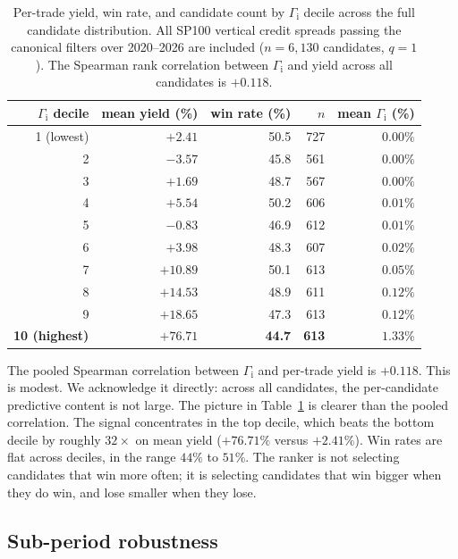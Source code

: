 \documentclass[11pt]{article}
\theoremstyle{definition}
\theoremstyle{remark}
\newcommand{\GROUND}{\Gamma_{\mathrm{i}}}
\begin{document}
\begin{table}[htbp]
\centering
\small
\begin{tabular}{rrrrr}
\toprule
$\GROUND$ decile & mean yield (\%) & win rate (\%) & $n$ & mean $\GROUND$ (\%) \\
\midrule
1 (lowest)  & $+2.41$  & 50.5 & 727 & $0.00\%$ \\
2           & $-3.57$  & 45.8 & 561 & $0.00\%$ \\
3           & $+1.69$  & 48.7 & 567 & $0.00\%$ \\
4           & $+5.54$  & 50.2 & 606 & $0.01\%$ \\
5           & $-0.83$  & 46.9 & 612 & $0.01\%$ \\
6           & $+3.98$  & 48.3 & 607 & $0.02\%$ \\
7           & $+10.89$ & 50.1 & 613 & $0.05\%$ \\
8           & $+14.53$ & 48.9 & 611 & $0.12\%$ \\
9           & $+18.65$ & 47.3 & 613 & $0.12\%$ \\
\textbf{10 (highest)}& $\mathbf{+76.71}$ & \textbf{44.7} & \textbf{613} & $\mathbf{1.33\%}$ \\
\bottomrule
\end{tabular}
\caption{Per-trade yield, win rate, and candidate count by
$\GROUND$ decile across the full candidate distribution. All SP100
vertical credit spreads passing the canonical filters over
2020--2026 are included ($n = 6{,}130$ candidates, $q = 1$). The
Spearman rank correlation between $\GROUND$ and yield across all
candidates is $+0.118$.}
\label{tab:decile}
\end{table}

The pooled Spearman correlation between $\GROUND$ and per-trade
yield is $+0.118$. This is modest. We acknowledge it directly:
across all candidates, the per-candidate predictive content is
not large. The picture in Table~\ref{tab:decile} is clearer than
the pooled correlation. The signal concentrates in the top
decile, which beats the bottom decile by roughly $32 \times$ on
mean yield ($+76.71\%$ versus $+2.41\%$). Win rates are flat
across deciles, in the range $44\%$ to $51\%$. The ranker is not
selecting candidates that win more often; it is selecting
candidates that win bigger when they do win, and lose smaller
when they lose.

\subsection{Sub-period robustness}
\end{document}
